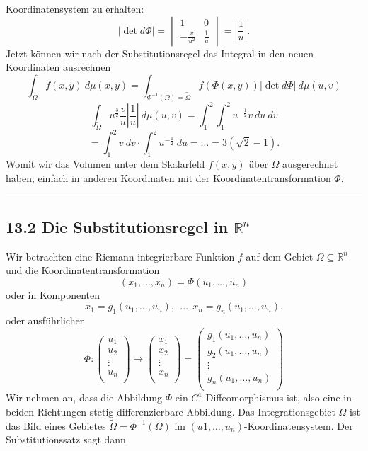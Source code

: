 \documentclass[a4paper,landscape,8pt]{extarticle}
\newcommand{\R}{\mathbb{R}}
\newcommand{\abs}[1]{\left\lvert #1 \right\rvert}
\newcommand{\sep}{\vspace{5pt}\noindent\hrule\vspace{5pt}}
\begin{document}
\begin{multicols*}{4}
Koordinatensystem zu erhalten:
\[
\abs{\det d\Phi}
=
\begin{vmatrix}
1 & 0 \\
-\frac{v}{u^2} & \frac{1}{u}
\end{vmatrix}
=
\abs{\frac{1}{u}}.
\]
Jetzt können wir nach der Substitutionsregel das Integral in den neuen
Koordinaten ausrechnen
\[
\int_\Omega f(x,y) \ d\mu(x,y)
=
\int_{\Phi^{-1}(\Omega)=\widetilde{\Omega}} f(\Phi(x,y)) \abs{\det d\Phi}\
d\mu(u,v)
\]
\[
\int_{\widetilde{\Omega}} u^{\frac{3}{2}} \frac{v}{u} \abs{\frac{1}{u}} \
d\mu(u,v)
=\int_1^2 \int_1^2 u^{-\frac{1}{2}} v \ du \ dv
\]
\[
=\int_1^2 v \ dv \cdot \int_1^2 u^{-\frac{1}{2}} \ du
= \ldots
= 3(\sqrt{2}-1).
\]
Womit wir das Volumen unter dem Skalarfeld $f(x,y)$ über $\Omega$ ausgerechnet
haben, einfach in anderen Koordinaten mit der Koordinatentransformation $\Phi$.
\sep

\subsection{13.2 Die Substitutionsregel in $\R^n$}

Wir betrachten eine Riemann-integrierbare Funktion $f$ auf dem Gebiet
$\Omega\subseteq\R^n$ und die Koordinatentransformation
\[
(x_1,\ldots,x_n) = \Phi(u_1,\ldots,u_n)
\]
oder in Komponenten
\[
x_1 = g_1(u_1,\ldots,u_n), \ \ \ldots \ \ x_n = g_n(u_1,\ldots,u_n).
\]
oder ausführlicher
\[
\Phi \colon
\begin{pmatrix}
u_1\\
u_2\\
\vdots\\
u_n\\
\end{pmatrix}
\mapsto
\begin{pmatrix}
x_1\\
x_2\\
\vdots\\
x_n\\
\end{pmatrix}
=
\begin{pmatrix}
g_1(u_1,\ldots,u_n)\\
g_2(u_1,\ldots,u_n)\\
\vdots\\
g_n(u_1,\ldots,u_n)\\
\end{pmatrix}
\]
Wir nehmen an, dass die Abbildung $\Phi$ ein $C^1$-Diffeomorphismus ist, also
eine in beiden Richtungen stetig-differenzierbare Abbildung. Das
Integrationsgebiet $\Omega$ ist das Bild eines Gebietes
$\widetilde{\Omega}=\Phi^{-1}(\Omega)$ im $(u1,\ldots,u_n)$-Koordinatensystem.
Der Substitutionssatz sagt dann


\end{multicols*}
\end{document}

